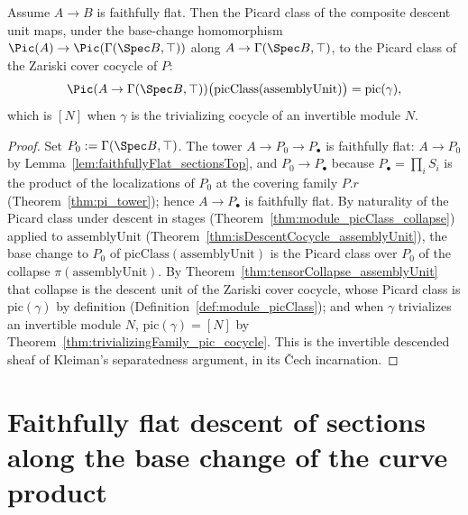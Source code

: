 \begin{theorem}
  \label{thm:mapAlgebra_picClass_assemblyUnit}
  \leanok
  Assume \(A \to B\) is faithfully flat. Then the Picard class of the composite descent unit
  maps, under the base-change homomorphism \(\Pic(A) \to \Pic(\Gamma(\Spec B, \top))\) along
  \(A \to \Gamma(\Spec B, \top)\), to the Picard class of the Zariski cover cocycle of \(P\):
  \[
    \Pic(A \to \Gamma(\Spec B, \top))\bigl(\mathrm{picClass}(\mathrm{assemblyUnit})\bigr)
      = \mathrm{pic}(\gamma) ,
  \]
  which is \([N]\) when \(\gamma\) is the trivializing cocycle of an invertible module \(N\).
\end{theorem}
\begin{proof}
  \leanok
  Set \(P_0 := \Gamma(\Spec B, \top)\). The tower \(A \to P_0 \to P_{\!\bullet}\) is faithfully
  flat: \(A \to P_0\) by Lemma~\ref{lem:faithfullyFlat_sectionsTop}, and \(P_0 \to
  P_{\!\bullet}\) because \(P_{\!\bullet} = \prod_i S_i\) is the product of the localizations of
  \(P_0\) at the covering family \(P.r\) (Theorem~\ref{thm:pi_tower}); hence \(A \to
  P_{\!\bullet}\) is faithfully flat. By naturality of the Picard class under descent in stages
  (Theorem~\ref{thm:module_picClass_collapse}) applied to \(\mathrm{assemblyUnit}\)
  (Theorem~\ref{thm:isDescentCocycle_assemblyUnit}), the base change to \(P_0\) of
  \(\mathrm{picClass}(\mathrm{assemblyUnit})\) is the Picard class over \(P_0\) of the collapse
  \(\pi(\mathrm{assemblyUnit})\). By Theorem~\ref{thm:tensorCollapse_assemblyUnit} that collapse
  is the descent unit of the Zariski cover cocycle, whose Picard class is \(\mathrm{pic}(\gamma)\)
  by definition (Definition~\ref{def:module_picClass}); and when \(\gamma\) trivializes an
  invertible module \(N\), \(\mathrm{pic}(\gamma) = [N]\) by
  Theorem~\ref{thm:trivializingFamily_pic_cocycle}. This is the invertible descended sheaf of
  Kleiman's separatedness argument, in its \v Cech incarnation.
\end{proof}

\section{Faithfully flat descent of sections along the base change of the curve product}
\label{sec:sectionsDescent}

